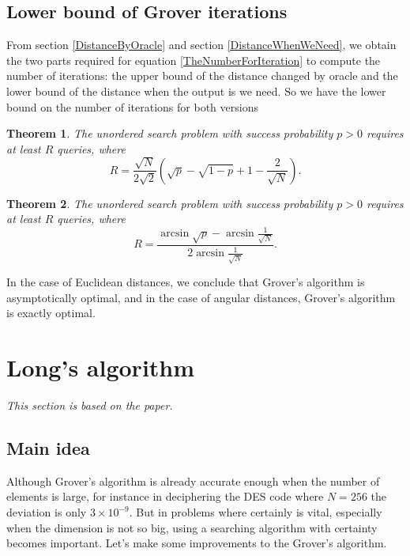 \documentclass[a4paper,10pt]{book}
\newtheorem{theorem}{Theorem}[section]
\numberwithin{equation}{section}
\begin{document}
\subsection{Lower bound of Grover iterations}



From section \ref{DistanceByOracle} and section \ref{DistanceWhenWeNeed}, we obtain the two parts required for equation \ref{TheNumberForIteration} to compute the number of iterations: the upper bound of the distance changed by oracle and the lower bound of the distance when the output is we need. So we have the lower bound on the number of iterations for both versions
\begin{theorem}
    The unordered search problem with success probability $p>0$ requires at least $R$ queries, where
    \begin{equation}
        R =\frac{\sqrt{N}}{2\sqrt{2}}\left(\sqrt{p}-\sqrt{1-p}+1-\frac{2}{\sqrt{N}}\right).
    \end{equation}
\end{theorem}
\begin{theorem}
    The unordered search problem with success probability $p>0$ requires at least $R$ queries, where
    \begin{equation}
        R =\frac{\arcsin\sqrt{p}-\arcsin\frac{1}{\sqrt{N}}}{2\arcsin\frac{1}{\sqrt{N}}}.
    \end{equation}
\end{theorem}
In the case of Euclidean distances, we conclude that Grover's algorithm is asymptotically optimal, and in the case of angular distances, Grover's algorithm is exactly optimal.



\section{Long's algorithm}

\textit{This section is based on the paper\cite{Long_2001}.}

\subsection{\label{subsec:LongMainIdea}Main idea}

Although Grover's algorithm is already accurate enough when the number of elements is large, for instance in deciphering the DES code where $N = 256$ the deviation is only $3\times 10^{-9}$. But in problems where certainly is vital, especially when the dimension is not so big, using a searching algorithm with certainty becomes important. Let's make some improvements to the Grover's algorithm.
\end{document}
